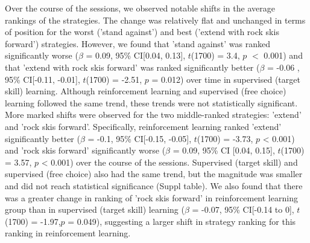 \documentclass[pdflatex,sn-mathphys-num]{sn-jnl}%
\theoremstyle{thmstyleone}%
\theoremstyle{thmstyletwo}%
\theoremstyle{thmstylethree}%
\begin{document}
Over the course of the sessions, we observed notable shifts in the average rankings of the strategies. The change was relatively flat and unchanged in terms of position for the worst ('stand against') and best ('extend with rock skis forward') strategies. However, we found that 'stand against' was ranked significantly worse ($\beta$ = 0.09, 95\% CI[0.04, 0.13], $t$(1700) = 3.4, $p$ $<$ 0.001)  and that 'extend with rock skis forward' was ranked significantly better ($\beta$ = -0.06 , 95\% CI[-0.11, -0.01], $t$(1700) = -2.51, $p$ = 0.012) over time in supervised (target skill) learning. Although reinforcement learning and supervised (free choice) learning followed the same trend, these trends were not statistically significant. More marked shifts were observed for the two middle-ranked strategies: 'extend' and 'rock skis forward'. Specifically, reinforcement learning ranked 'extend' significantly better  ($\beta$ = -0.1, 95\% CI[-0.15, -0.05], $t$(1700) = -3.73, $p$ < 0.001) and 'rock skis forward' significantly worse ($\beta$ = 0.09, 95\% CI [0.04, 0.15], $t$(1700) = 3.57, $p$ < 0.001) over the course of the sessions. Supervised (target skill) and supervised (free choice) also had the same trend, but the magnitude was smaller and did not reach statistical significance (Suppl table). We also found that there was a greater change in ranking of 'rock skis forward' in reinforcement learning group than in supervised (target skill) learning  ($\beta$ = -0.07, 95\% CI[-0.14 to 0], $t$(1700) = -1.97,$p$ = 0.049), suggesting a larger shift in strategy ranking for this ranking in reinforcement learning.  
\end{document}
